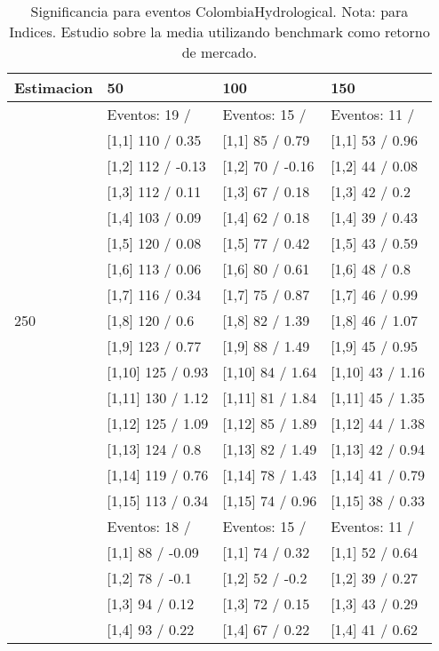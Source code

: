\begin{table}

\caption{Significancia para eventos ColombiaHydrological. Nota: para Indices. Estudio sobre la media utilizando benchmark como retorno de mercado.}
\centering
\begin{tabular}[t]{llll}
\toprule
Estimacion & 50 & 100 & 150\\
\midrule
 & Eventos:  19 / & Eventos:  15 / & Eventos:  11 /\\
 & {}[1,1] 110  / 0.35 & {}[1,1] 85  / 0.79 & {}[1,1] 53  / 0.96\\
 & {}[1,2] 112  / -0.13 & {}[1,2] 70  / -0.16 & {}[1,2] 44  / 0.08\\
 & {}[1,3] 112  / 0.11 & {}[1,3] 67  / 0.18 & {}[1,3] 42  / 0.2\\
 & {}[1,4] 103  / 0.09 & {}[1,4] 62  / 0.18 & {}[1,4] 39  / 0.43\\
\addlinespace
 & {}[1,5] 120  / 0.08 & {}[1,5] 77  / 0.42 & {}[1,5] 43  / 0.59\\
 & {}[1,6] 113  / 0.06 & {}[1,6] 80  / 0.61 & {}[1,6] 48  / 0.8\\
 & {}[1,7] 116  / 0.34 & {}[1,7] 75  / 0.87 & {}[1,7] 46  / 0.99\\
250 & {}[1,8] 120  / 0.6 & {}[1,8] 82  / 1.39 & {}[1,8] 46  / 1.07\\
 & {}[1,9] 123  / 0.77 & {}[1,9] 88  / 1.49 & {}[1,9] 45  / 0.95\\
\addlinespace
 & {}[1,10] 125  / 0.93 & {}[1,10] 84  / 1.64 & {}[1,10] 43  / 1.16\\
 & {}[1,11] 130  / 1.12 & {}[1,11] 81  / 1.84 & {}[1,11] 45  / 1.35\\
 & {}[1,12] 125  / 1.09 & {}[1,12] 85  / 1.89 & {}[1,12] 44  / 1.38\\
 & {}[1,13] 124  / 0.8 & {}[1,13] 82  / 1.49 & {}[1,13] 42  / 0.94\\
 & {}[1,14] 119  / 0.76 & {}[1,14] 78  / 1.43 & {}[1,14] 41  / 0.79\\
\addlinespace
 & {}[1,15] 113  / 0.34 & {}[1,15] 74  / 0.96 & {}[1,15] 38  / 0.33\\
 & Eventos:  18 / & Eventos:  15 / & Eventos:  11 /\\
 & {}[1,1] 88  / -0.09 & {}[1,1] 74  / 0.32 & {}[1,1] 52  / 0.64\\
 & {}[1,2] 78  / -0.1 & {}[1,2] 52  / -0.2 & {}[1,2] 39  / 0.27\\
 & {}[1,3] 94  / 0.12 & {}[1,3] 72  / 0.15 & {}[1,3] 43  / 0.29\\
\addlinespace
 & {}[1,4] 93  / 0.22 & {}[1,4] 67  / 0.22 & {}[1,4] 41  / 0.62\\

\end{tabular}
\end{table}
